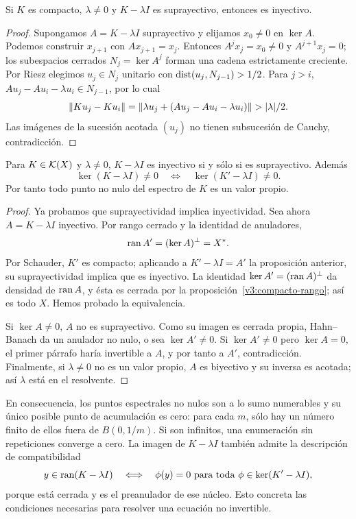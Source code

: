 \begin{proposicion}\label{v3:compacto-sobreyectivo}
Si $K$ es compacto, $\lambda\ne0$ y $K-\lambda I$ es suprayectivo, entonces es inyectivo.
\end{proposicion}
\begin{proof}
Supongamos $A=K-\lambda I$ suprayectivo y elijamos $x_0\ne0$ en $\ker A$. Podemos construir $x_{j+1}$ con $Ax_{j+1}=x_j$. Entonces $A^jx_j=x_0\ne0$ y $A^{j+1}x_j=0$; los subespacios cerrados $N_j=\ker A^j$ forman una cadena estrictamente creciente. Por Riesz elegimos $u_j\in N_j$ unitario con $\operatorname{dist}(u_j,N_{j-1})>1/2$. Para $j>i$, $Au_j-Au_i-\lambda u_i\in N_{j-1}$, por lo cual
\[\left\lVert Ku_j-Ku_i\right\rVert
=\left\lVert\lambda u_j+(Au_j-Au_i-\lambda u_i)\right\rVert>|\lambda|/2.
\]
Las imágenes de la sucesión acotada $(u_j)$ no tienen subsucesión de Cauchy, contradicción.
\end{proof}

\begin{teorema}\label{v3:fredholm}
Para $K\in\mathcal K(X)$ y $\lambda\ne0$, $K-\lambda I$ es inyectivo si y sólo si es suprayectivo. Además
\[\ker(K-\lambda I)\ne0\quad\Longleftrightarrow\quad\ker(K'-\lambda I)\ne0.
\]
Por tanto todo punto no nulo del espectro de $K$ es un valor propio.
\end{teorema}
\begin{proof}
Ya probamos que suprayectividad implica inyectividad. Sea ahora $A=K-\lambda I$ inyectivo. Por rango cerrado y la identidad de anuladores,
\[\operatorname{ran} A'=(\ker A)^\perp=X^*.
\]
Por Schauder, $K'$ es compacto; aplicando a $K'-\lambda I=A'$ la proposición anterior, su suprayectividad implica que es inyectivo. La identidad $\ker A'=(\operatorname{ran} A)^\perp$ da densidad de $\operatorname{ran} A$, y ésta es cerrada por la proposición~\ref{v3:compacto-rango}; así es todo $X$. Hemos probado la equivalencia.

Si $\ker A\ne0$, $A$ no es suprayectivo. Como su imagen es cerrada propia, Hahn--Banach da un anulador no nulo, o sea $\ker A'\ne0$. Si $\ker A'\ne0$ pero $\ker A=0$, el primer párrafo haría invertible a $A$, y por tanto a $A'$, contradicción. Finalmente, si $\lambda\ne0$ no es un valor propio, $A$ es biyectivo y su inversa es acotada; así $\lambda$ está en el resolvente.
\end{proof}
En consecuencia, los puntos espectrales no nulos son a lo sumo numerables y su único posible punto de acumulación es cero: para cada $m$, sólo hay un número finito de ellos fuera de $B(0,1/m)$. Si son infinitos, una enumeración sin repeticiones converge a cero. La imagen de $K-\lambda I$ también admite la descripción de compatibilidad
\[y\in\operatorname{ran}(K-\lambda I)\quad\Longleftrightarrow\quad
\phi(y)=0\text{ para toda }\phi\in\ker(K'-\lambda I),
\]
porque está cerrada y es el preanulador de ese núcleo. Esto concreta las condiciones necesarias para resolver una ecuación no invertible.


